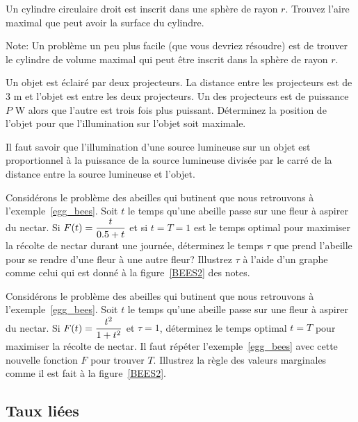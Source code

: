 \begin{question}[\eng]
Un cylindre circulaire droit est inscrit dans une sphère de rayon $r$.
Trouvez l'aire maximal que peut avoir la surface du cylindre.

\noindent Note: Un problème un peu plus facile (que vous devriez résoudre)
est de trouver le cylindre de volume maximal qui peut être inscrit dans la
sphère de rayon $r$. 
\label{6Q37}
\end{question}

\begin{question}[\eng]
Un objet est éclairé par deux projecteurs.  La distance entre les projecteurs
est de $3$ m et l'objet est entre les deux projecteurs.  Un des projecteurs
est de puissance $P$ W alors que l'autre est trois fois plus puissant.
Déterminez la position de l'objet pour que l'illumination sur l'objet soit
maximale.

Il faut savoir que l'illumination d'une source lumineuse sur un objet est
proportionnel à la puissance de la source lumineuse divisée par le carré de
la distance entre la source lumineuse et l'objet. 
\label{6Q38}
\end{question}

\begin{question}[\life]
Considérons le problème des abeilles qui butinent que nous retrouvons à
l'exemple~\ref{egg_bees}.  Soit $t$ le temps qu'une abeille passe sur
une fleur à aspirer du nectar.  Si
$\displaystyle F(t) = \frac{t}{0.5+t}$ et si $t=T=1$ est le temps
optimal pour maximiser la récolte de nectar durant une journée,
déterminez le temps $\tau$ que prend l'abeille pour se rendre d'une
fleur à une autre fleur?  Illustrez $\tau$ à l'aide d'un graphe comme
celui qui est donné à la figure~\ref{BEES2} des notes.
\label{6Q39}
\end{question}

\begin{question}[\life]
Considérons le problème des abeilles qui butinent que nous retrouvons à
l'exemple~\ref{egg_bees}.  Soit $t$ le temps qu'une abeille passe sur
une fleur à aspirer du nectar.  Si
$\displaystyle F(t) = \frac{t^2}{1+t^2}$ et $\tau = 1$, déterminez le
temps optimal $t=T$ pour maximiser la récolte de nectar.  Il faut
répéter l'exemple~\ref{egg_bees} avec cette nouvelle fonction $F$ pour
trouver $T$.  Illustrez la règle des valeurs marginales comme il est
fait à la figure~\ref{BEES2}.
\label{6Q40}
\end{question}

\subsection{Taux liées}

